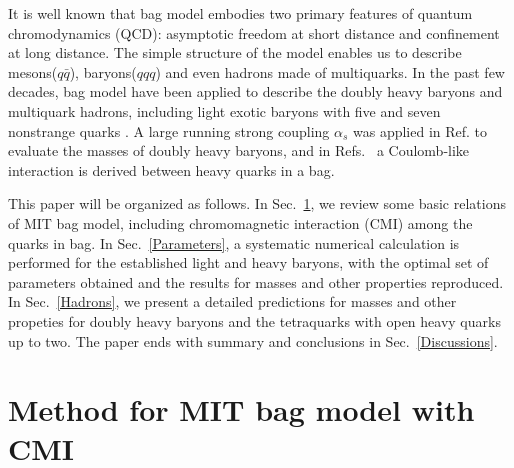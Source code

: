 \documentclass[prt,twocolumn,floatfix,nofootinbib]{revtex4}
\begin{document}
It is well known that bag model \cite{DeGrand:1975cf} embodies two primary features of quantum chromodynamics (QCD): asymptotic freedom at short distance and confinement at long distance. The simple structure of the model enables us to describe mesons($q\bar{q}$), baryons($qqq$) and even hadrons made of multiquarks. In the past few decades, bag model have been applied to describe the doubly heavy baryons\cite{Fleck:1989mb,He:2004px, Bernotas:2012nz} and multiquark hadrons, including light exotic baryons with five and seven nonstrange quarks \cite{Strottman:1979qu}. A large running strong coupling $\alpha_{s}$ was applied in Ref. \cite{He:2004px} to evaluate the masses of doubly heavy baryons, and in Refs.~\cite{Haxton:1980mc,Aerts:1980rf} a Coulomb-like interaction is derived between heavy quarks in a bag.

This paper will be organized as follows. In Sec.~\ref{Method}, we review some basic relations of MIT bag model, including chromomagnetic interaction (CMI) among the quarks in bag.
In Sec.~\ref{Parameters}, a systematic numerical calculation is performed for the established light and heavy baryons, with the optimal set of parameters obtained and the results for masses and other properties reproduced.
In Sec.~\ref{Hadrons}, we present a detailed predictions for masses and other propeties for doubly heavy baryons and the tetraquarks with open heavy quarks up to two. The paper ends with summary and conclusions in Sec.~\ref{Discussions}.


\section{Method for MIT bag model with CMI}\label{Method}
\end{document}
